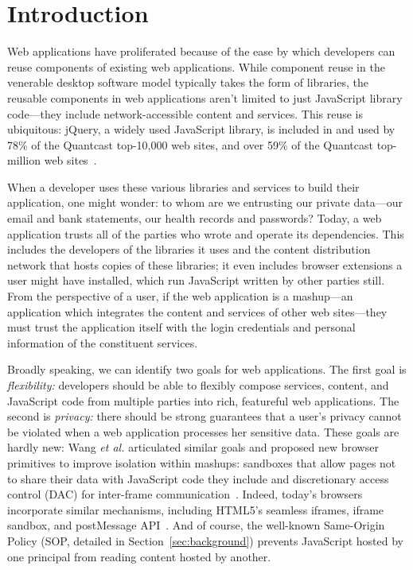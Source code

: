 \section{Introduction}
\label{sec:intro}

Web applications have proliferated because of the ease by which
developers can reuse components of existing web applications.
%
While component reuse in the venerable desktop software model typically
takes the form of libraries, the reusable components in web applications
aren't limited to just JavaScript library code---they include
network-accessible content and services.
%
This reuse is ubiquitous\@: jQuery, a widely used JavaScript
library, is included in and used by 78\% of the Quantcast top-10,000
web sites, and over 59\% of the Quantcast top-million web
sites~\cite{quantcast}.

When a developer uses these various libraries and services to build
their application, one might wonder: to whom are we entrusting our
private data---our email and bank statements, our health records and
passwords?
%
Today, a web application trusts all of the parties who wrote and
operate its dependencies.
%
This includes the developers of the libraries it uses and the content
distribution network that hosts copies of these libraries; it even
includes browser extensions a user might have installed, which run
JavaScript written by other parties still.
%
From the perspective of a user, if the web application is a mashup---an
application which integrates the content and services of other web
sites---they must trust the application itself with the login
credentials and personal information of the constituent services.

 Broadly speaking, we can identify two goals for web applications.
%
The first goal is {\em flexibility:\/} developers should be able to
flexibly compose services, content, and JavaScript code from multiple
parties into rich, featureful web applications.
%
The second is {\em privacy:\/} there should be strong guarantees that a
user's privacy cannot be violated when a web application processes her
sensitive data.
%
These goals are hardly new: Wang {\em et al.} articulated similar goals
and proposed new browser primitives to improve isolation within mashups:
sandboxes that allow pages not to share their data with JavaScript code
they include and discretionary access control (DAC) for inter-frame
communication~\cite{mashupos}.
%
Indeed, today's browsers incorporate similar mechanisms, including
HTML5's seamless iframes, iframe sandbox, and postMessage
API~\cite{html5}.
%
And of course, the well-known Same-Origin Policy (SOP, detailed in
Section~\ref{sec:background}) prevents JavaScript hosted by one principal from
reading content hosted by another.

